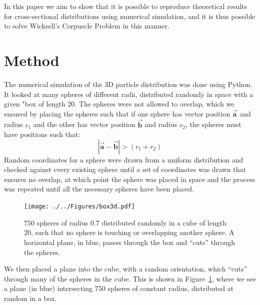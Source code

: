 \documentclass[journal]{IEEEtran}
\begin{document}
In this paper we aim to show that it is possible to reproduce theoretical
results for cross-sectional distributions using numerical simulation, and it is
thus possible to solve Wicksell's Corpuscle Problem in this manner.


\section{Method}

The numerical simulation of the 3D particle distribution was done using
Python. It looked at many spheres of different radii, distributed randomly in
space with a given "box of length 20. The spheres were not allowed to overlap,
which we ensured by placing the spheres such that if one sphere has vector
position $\overrightarrow{\textbf{a}}$ and radius $r_{1}$ and the other has
vector position $\overrightarrow{\textbf{b}}$ and radius $r_{2}$, the spheres
must have positions such that:
\begin{equation*}
|\overrightarrow{\textbf{a}} - \overrightarrow{\textbf{b}}| > (r_{1} + r_{2})
\end{equation*}
Random coordinates for a sphere were drawn from a uniform distribution and
checked against every existing sphere until a set of coordinates was drawn that
ensures no overlap, at which point the sphere was placed in space and the process
was repeated until all the necessary spheres have been placed.

\begin{figure}%
\begin{center}
\texttt{[image: ./../Figures/box3d.pdf]}
\caption{$750$ spheres of radius 0.7 distributed randomly in a cube of length 20,
  such that no sphere is touching or overlapping another sphere. A horizontal
  plane, in blue, passes through the box and ``cuts'' through the
  spheres.}\label{fig:3dplot_plane}
\end{center}
\end{figure}

We then placed a plane into the cube, with a random orientation, which
``cuts'' through many of the spheres in the cube. This is shown in
Figure~\ref{fig:3dplot_plane}, where we see a plane (in blue) intersecting 750
spheres of constant radius, distributed at random in a box.
\end{document}
